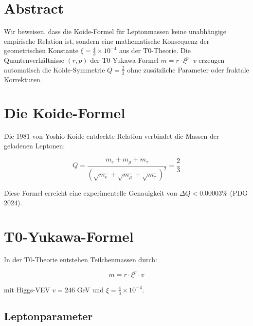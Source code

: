 \section*{Abstract}
		Wir beweisen, dass die Koide-Formel für Leptonmassen keine unabhängige empirische Relation ist, sondern eine mathematische Konsequenz der geometrischen Konstante $\xi = \frac{4}{3} \times 10^{-4}$ aus der T0-Theorie. Die Quantenverhältnisse $(r,p)$ der T0-Yukawa-Formel $m = r \cdot \xi^p \cdot v$ erzeugen automatisch die Koide-Symmetrie $Q = \frac{2}{3}$ ohne zusätzliche Parameter oder fraktale Korrekturen.

	
	\section{Die Koide-Formel}
	
	Die 1981 von Yoshio Koide entdeckte Relation verbindet die Massen der geladenen Leptonen:
	
	\begin{equation}
		Q = \frac{m_e + m_\mu + m_\tau}{\left( \sqrt{m_e} + \sqrt{m_\mu} + \sqrt{m_\tau} \right)^2} = \frac{2}{3}
		\label{eq:koide}
	\end{equation}
	
	Diese Formel erreicht eine experimentelle Genauigkeit von $\Delta Q < 0.00003\%$ (PDG 2024).
	
	\section{T0-Yukawa-Formel}
	
	In der T0-Theorie entstehen Teilchenmassen durch:
	
	\begin{equation}
		m = r \cdot \xi^p \cdot v
		\label{eq:t0yukawa}
	\end{equation}
	
	mit Higgs-VEV $v = 246$ GeV und $\xi = \frac{4}{3} \times 10^{-4}$.
	
	\subsection{Leptonparameter}
	
	\begin{table}[h]
		\centering
		\caption{T0-Quantenverhältnisse der geladenen Leptonen}
	\end{table}
	
